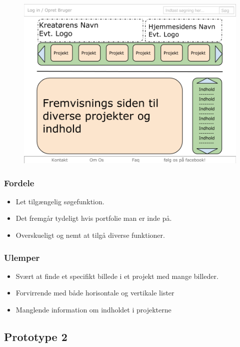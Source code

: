 \documentclass[a4paper,titlepage,fleqn,12pt]{article}
\begin{document}
\begin{figure}[H]
\includegraphics[width=\textwidth]{hjemmesidedesign1.png}

\end{figure}

\subsubsection{Fordele}

\begin{itemize}
\item Let tilgængelig søgefunktion.
\item Det fremgår tydeligt hvis portfolie man er inde på.
\item Overskueligt og nemt at tilgå diverse funktioner.
\end{itemize}

\subsubsection{Ulemper}
\begin{itemize}
\item Svært at finde et specifikt billede i et projekt med mange billeder. 
\item Forvirrende med både horisontale og vertikale lister
\item Manglende information om indholdet i projekterne
\end{itemize}

\subsection{Prototype 2}
\end{document}
